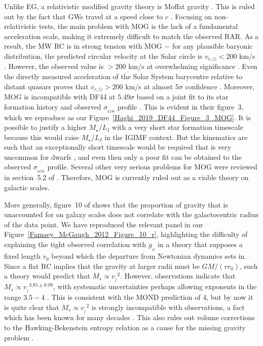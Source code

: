 \documentclass[fleqn,usenatbib,useAMS,onecolumn]{mnras} %
\begin{document}
Unlike EG, a relativistic modified gravity theory is Moffat gravity \citep[MOG;][]{Moffat_2006}. This is ruled out by the fact that GWs travel at a speed close to $c$ \citep{Boran_2018}. Focusing on non-relativistic tests, the main problem with MOG is the lack of a fundamental acceleration scale, making it extremely difficult to match the observed RAR. As a result, the MW RC is in strong tension with MOG $-$ for any plausible baryonic distribution, the predicted circular velocity at the Solar circle is $v_{c, \odot} < 200$ km/s \citep{Negrelli_2018}. However, the observed value is $> 200$ km/s at overwhelming significance \citep[e.g.][]{McMillan_2017, McGaugh_2018}. Even the directly measured acceleration of the Solar System barycentre relative to distant quasars proves that $v_{c, \odot} > 200$ km/s at almost $5\sigma$ confidence \citep{Bovy_2020, Klioner_2021}. Moreover, MOG is incompatible with DF44 at $5.49 \sigma$ based on a joint fit to its star formation history and observed $\sigma_{_\text{LOS}}$ profile \citep{Haghi_2019_DF44}. This is evident in their figure~3, which we reproduce as our Figure~\ref{Haghi_2019_DF44_Figure_3_MOG}. It is possible to justify a higher $M_{\star}/L_I$ with a very short star formation timescale because this would raise $M_{\star}/L_I$ in the IGIMF context. But the kinematics are such that an exceptionally short timescale would be required that is very uncommon for dwarfs \citep{Jan_2009}, and even then only a poor fit can be obtained to the observed $\sigma_{_\text{LOS}}$ profile. Several other very serious problems for MOG were reviewed in section~5.2 of \citet{Martino_2020}. Therefore, MOG is currently ruled out as a viable theory on galactic scales.

More generally, figure~10 of \citet{Famaey_McGaugh_2012} shows that the proportion of gravity that is unaccounted for on galaxy scales does not correlate with the galactocentric radius of the data point. We have reproduced the relevant panel in our Figure~\ref{Famaey_McGaugh_2012_Figure_10_r}, highlighting the difficulty of explaining the tight observed correlation with $g_{_N}$ in a theory that supposes a fixed length $r_0$ beyond which the departure from Newtonian dynamics sets in. Since a flat RC implies that the gravity at larger radii must be $GM/\left(rr_0\right)$, such a theory would predict that $M_s \propto {v_{_f}}^2$. However, observations indicate that $M_s \propto {v_{_f}}^{3.85 \pm 0.09}$, with systematic uncertainties perhaps allowing exponents in the range $3.5-4$ \citep{Lelli_2019}. This is consistent with the MOND prediction of 4, but by now it is quite clear that $M_s \propto {v_{_f}}^2$ is strongly incompatible with observations, a fact which has been known for many decades \citep{McGaugh_2000}. This also rules out volume corrections to the Hawking-Bekenstein entropy relation as a cause for the missing gravity problem \citep{Perez_Cuellar_2021}.
\end{document}
